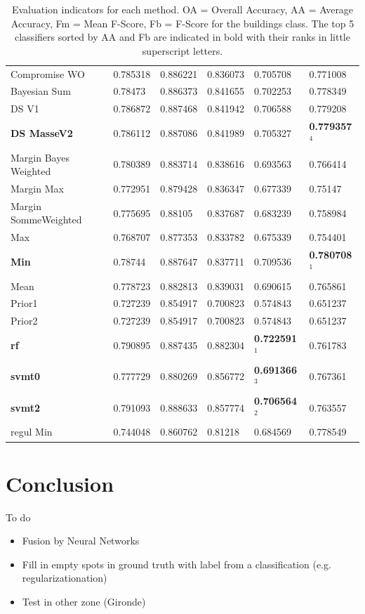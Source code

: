 \documentclass[10pt]{article}
\begin{document}
\begin{table}[H]
\begin{tabular}{llllll}
Compromise WO & 0.785318 & 0.886221 & 0.836073 & 0.705708 & 0.771008\\
Bayesian Sum & 0.78473 & 0.886373 & 0.841655 & 0.702253 & 0.778349\\
DS V1 & 0.786872 & 0.887468 & 0.841942 & 0.706588 & 0.779208\\
\textbf{DS MasseV2} & 0.786112 & 0.887086 & 0.841989 & 0.705327 & \textbf{0.779357$^4$}\\
Margin Bayes Weighted & 0.780389 & 0.883714 & 0.838616 & 0.693563 & 0.766414\\
Margin Max & 0.772951 & 0.879428 & 0.836347 & 0.677339 & 0.75147\\
Margin SommeWeighted & 0.775695 & 0.88105 & 0.837687 & 0.683239 & 0.758984\\
Max & 0.768707 & 0.877353 & 0.833782 & 0.675339 & 0.754401\\
\textbf{Min} & 0.78744 & 0.887647 & 0.837711 & 0.709536 & \textbf{0.780708$^1$}\\
Mean & 0.778723 & 0.882813 & 0.839031 & 0.690615 & 0.765861\\
Prior1 & 0.727239 & 0.854917 & 0.700823 & 0.574843 & 0.651237\\
Prior2 & 0.727239 & 0.854917 & 0.700823 & 0.574843 & 0.651237\\\hline
\textbf{rf} & 0.790895 & 0.887435 & 0.882304 & \textbf{0.722591$^1$} & 0.761783\\
\textbf{svmt0} & 0.777729 & 0.880269 & 0.856772 & \textbf{0.691366$^3$} & 0.767361\\
\textbf{svmt2} & 0.791093 & 0.888633 & 0.857774 & \textbf{0.706564$^2$} & 0.763557\\\hline
regul Min & 0.744048 & 0.860762 & 0.81218 & 0.684569 & 0.778549\\\bottomrule
\end{tabular}
\caption{Evaluation indicators for each method. OA = Overall Accuracy, AA = Average Accuracy, Fm = Mean F-Score, Fb = F-Score for the buildings class. The top 5 classifiers sorted by AA and Fb are indicated in bold with their ranks in little superscript letters.}
\label{table:eval}
\end{table}


\newpage

\section{Conclusion}
To do 
\begin{itemize}
    \item Fusion by Neural Networks
    \item Fill in empty spots in ground truth with label from a classification (e.g. regularizationation)
    \item Test in other zone (Gironde)
\end{itemize}
\pagebreak
\printbibliography[heading=bibintoc,heading=bibnumbered]
\end{document}
